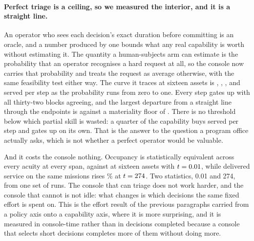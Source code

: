 \documentclass[11pt]{article}
\begin{document}
\paragraph{Perfect triage is a ceiling, so we measured the interior, and it is a straight line.} An
operator who sees each decision's exact duration before committing is an oracle, and a number
produced by one bounds what any real capability is worth without estimating it. The quantity a
human-subjects arm can estimate is the probability that an operator recognises a hard request at
all, so the console now carries that probability and treats the request as average otherwise, with
the same feasibility test either way. The curve it traces at sixteen assets is \AcZero{},
\AcQuarter{}, \AcHalf{}, \AcThreeQ{} and \AcFull{} served per step as the probability runs from zero
to one. Every step gates up with all thirty-two blocks agreeing, and the largest departure from a
straight line through the endpoints is \AcLinMax{} against a materiality floor of \AcFloor{}. There
is no threshold below which partial skill is wasted: a quarter of the capability buys
\AcQuarterGain{} served per step and gates up on its own. That is the answer to the question a
program office actually asks, which is not whether a perfect operator would be valuable.

And it costs the console nothing. Occupancy is statistically equivalent across every acuity at every
span, \AcBusyZero{} against \AcBusyFull{} at sixteen assets with $t = 0.01{}$, while delivered
service on the same missions rises \AcGainPct\% at $t = 274{}$. Two statistics, 0.01 and 274,
from one set of runs. The console that can triage does not work harder, and the console that cannot
is not idle: what changes is which decisions the same fixed effort is spent on. This is the effort
result of the previous paragraphs carried from a policy axis onto a capability axis, where it is
more surprising, and it is measured in console-time rather than in decisions completed because a
console that selects short decisions completes more of them without doing more.
\end{document}

